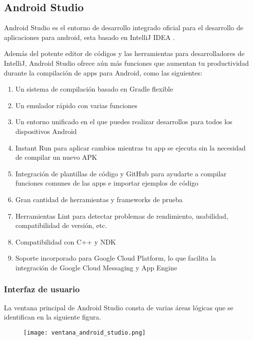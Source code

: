 \subsection{Android Studio}
Android Studio es el entorno de desarrollo integrado oficial para el desarrollo de aplicaciones para android, esta basado en IntelliJ IDEA \cite{INTELLIJ}.

Además del potente editor de códigos y las herramientas para desarrolladores de IntelliJ, Android Studio ofrece aún más funciones que aumentan tu productividad durante la compilación de apps para Android, como las siguientes:

\begin{enumerate}
\item Un sistema de compilación basado en Gradle flexible
\item Un emulador rápido con varias funciones
\item Un entorno unificado en el que puedes realizar desarrollos para todos los dispositivos Android
\item Instant Run para aplicar cambios mientras tu app se ejecuta sin la necesidad de compilar un nuevo APK
\item Integración de plantillas de código y GitHub para ayudarte a compilar funciones comunes de las apps e importar ejemplos de código
\item Gran cantidad de herramientas y frameworks de prueba
\item Herramientas Lint para detectar problemas de rendimiento, usabilidad, compatibilidad de versión, etc.
\item Compatibilidad con C++ y NDK
\item Soporte incorporado para Google Cloud Platform, lo que facilita la integración de Google Cloud Messaging y App Engine
\end{enumerate}
\subsubsection{Interfaz de usuario}
La ventana principal de Android Studio consta de varias áreas lógicas que se identifican en la siguiente figura.
\linebreak 
\begin{figure}[h]
\texttt{[image: ventana\_android\_studio.png]} 
\end{figure}

